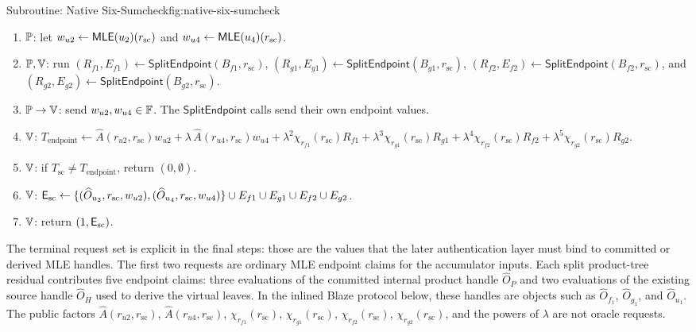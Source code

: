 \begin{protocolbox}{Subroutine: Native Six-Sumcheck}{fig:native-six-sumcheck}
\begin{enumerate}[leftmargin=0.24in,label=\textbf{S\arabic*.},itemsep=0.06em,topsep=0.06em,parsep=0pt]
  \item \(\mathbb{P}\): let \(w_{u2}\gets\mathsf{MLE}(u_2)(r_{\mathrm{sc}})\) and
        \(w_{u4}\gets\mathsf{MLE}(u_4)(r_{\mathrm{sc}})\).
  \item \(\mathbb{P},\mathbb{V}\): run
        \((R_{f1},E_{f1})\gets\mathsf{SplitEndpoint}(B_{f1},r_{\mathrm{sc}})\),
        \((R_{g1},E_{g1})\gets\mathsf{SplitEndpoint}(B_{g1},r_{\mathrm{sc}})\),
        \((R_{f2},E_{f2})\gets\mathsf{SplitEndpoint}(B_{f2},r_{\mathrm{sc}})\), and
        \((R_{g2},E_{g2})\gets\mathsf{SplitEndpoint}(B_{g2},r_{\mathrm{sc}})\).
  \item \(\mathbb{P}\to\mathbb{V}\): send \(w_{u2},w_{u4}\in\mathbb{F}\).  The
        \(\mathsf{SplitEndpoint}\) calls send their own endpoint values.
  \item \(\mathbb{V}\): \(T_{\mathrm{endpoint}}\gets
        \widehat A(r_{u2},r_{\mathrm{sc}})
        w_{u2}
        +\lambda\,\widehat A(r_{u4},r_{\mathrm{sc}})
        w_{u4}
        +\lambda^2\chi_{r_{f1}}(r_{\mathrm{sc}})R_{f1}
        +\lambda^3\chi_{r_{g1}}(r_{\mathrm{sc}})R_{g1}
        +\lambda^4\chi_{r_{f2}}(r_{\mathrm{sc}})R_{f2}
        +\lambda^5\chi_{r_{g2}}(r_{\mathrm{sc}})R_{g2}\).
  \item \(\mathbb{V}\): if \(T_{\mathrm{sc}}\ne T_{\mathrm{endpoint}}\), return \((0,\emptyset)\).
  \item \(\mathbb{V}\): \(\mathsf{E}_{\mathrm{sc}}\gets
        \{(\widehat O_{u_2},r_{\mathrm{sc}},w_{u2}),
        (\widehat O_{u_4},r_{\mathrm{sc}},w_{u4})\}
        \cup E_{f1}\cup E_{g1}\cup E_{f2}\cup E_{g2}\).
  \item \(\mathbb{V}\): return \((1,\mathsf{E}_{\mathrm{sc}})\).
\end{enumerate}
\end{protocolbox}

The terminal request set is explicit in the final steps: those are the values
that the later authentication layer must bind to committed or derived MLE
handles.  The first two requests are ordinary MLE endpoint claims for the
accumulator inputs.  Each split product-tree residual contributes five endpoint
claims: three evaluations of the committed internal product handle
\(\widehat O_P\) and two evaluations of the existing source handle
\(\widehat O_H\) used to derive the virtual leaves.  In the inlined Blaze
protocol below, these handles are objects such as \(\widehat O_{f_1}\),
\(\widehat O_{g_1}\), and \(\widehat O_{u_1}\).
The public factors \(\widehat A(r_{u2},r_{\mathrm{sc}})\),
\(\widehat A(r_{u4},r_{\mathrm{sc}})\), \(\chi_{r_{f1}}(r_{\mathrm{sc}})\),
\(\chi_{r_{g1}}(r_{\mathrm{sc}})\), \(\chi_{r_{f2}}(r_{\mathrm{sc}})\),
\(\chi_{r_{g2}}(r_{\mathrm{sc}})\), and the powers of \(\lambda\) are not oracle
requests.

